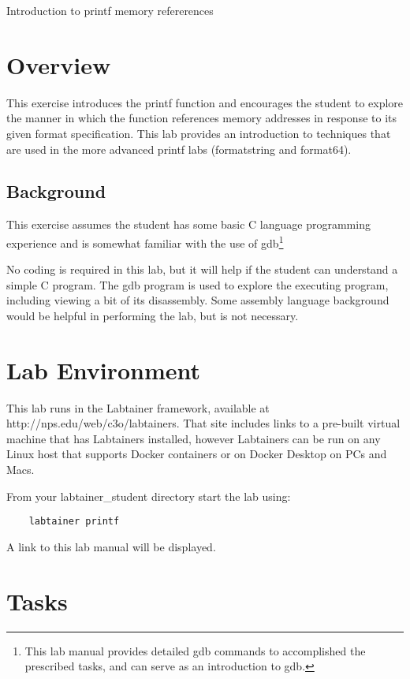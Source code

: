 


\begin{center}
{\LARGE Introduction to printf memory refererences}
\vspace{0.1in}\\
\end{center}


\section{Overview}
This exercise introduces the printf function and 
encourages the student to explore the manner in which the
function references memory addresses in response to its
given format specification.
This lab provides an introduction to techniques that are used
in the more advanced printf labs (formatstring and format64).

\subsection{Background}
This exercise assumes the student has some basic C language programming
experience and is somewhat familiar with the use of gdb\footnote{This lab
manual provides detailed gdb commands to accomplished the prescribed tasks,
and can serve as an introduction to gdb.}

No coding is required in this lab, but it will help if the student
can understand a simple C program.
The gdb program is used to explore the executing program, including viewing
a bit of its disassembly.  Some assembly language background 
would be helpful in performing the lab, but is not necessary.

\section{Lab Environment}
This lab runs in the Labtainer framework,
available at http://nps.edu/web/c3o/labtainers.
That site includes links to a pre-built virtual machine
that has Labtainers installed, however Labtainers can
be run on any Linux host that supports Docker containers
or on Docker Desktop on PCs and Macs.

From your labtainer_student directory start the lab using:
\begin{verbatim}
    labtainer printf
\end{verbatim}
A link to this lab manual will be displayed.


\section{Tasks}

